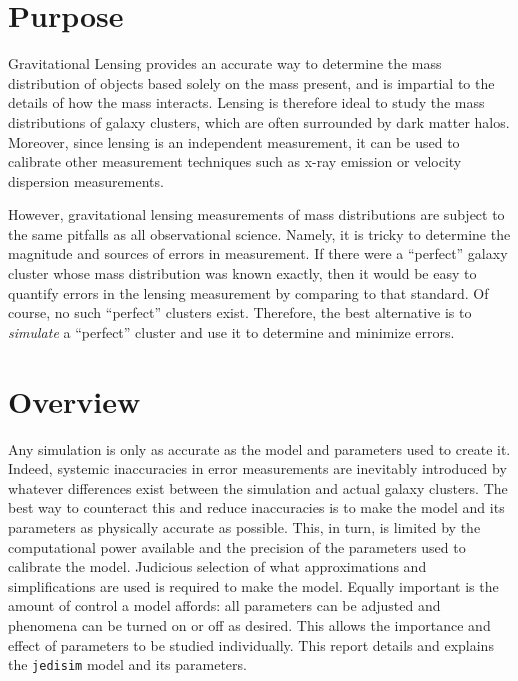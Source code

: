 \documentclass[10pt,twoside]{article}
\theoremstyle{definition}
\theoremstyle{exercise}
\begin{document}
\section{Purpose}

Gravitational Lensing provides an accurate way to determine the mass distribution of objects based solely on the mass present, and is impartial to the details of how the mass interacts. Lensing is therefore ideal to study the mass distributions of galaxy clusters, which are often surrounded by dark matter halos. Moreover, since lensing is an independent measurement, it can be used to calibrate other measurement techniques such as x-ray emission or velocity dispersion measurements.  

  However, gravitational lensing measurements of mass distributions are subject to the same pitfalls as all observational science. Namely, it is tricky to determine the magnitude and sources of errors in measurement. If there were a ``perfect'' galaxy cluster whose mass distribution was known exactly, then it would be easy to quantify errors in the lensing measurement by comparing to that standard. Of course, no such ``perfect'' clusters exist. Therefore, the best alternative is to \textit{simulate} a ``perfect'' cluster and use it to determine and minimize errors.



\section{Overview}

Any simulation is only as accurate as the model and parameters used to create it. Indeed, systemic inaccuracies in error measurements are inevitably introduced by whatever differences exist between the simulation and actual galaxy clusters. The best way to counteract this and reduce inaccuracies is to make the model and its parameters as physically accurate as possible. This, in turn, is limited by the computational power available and the precision of the parameters used to calibrate the model. Judicious selection of what approximations and simplifications are used is required to make the model. Equally important is the amount of control a model affords: all parameters can be adjusted and phenomena can be turned on or off as desired. This allows the importance and effect of parameters to be studied individually. This report details and explains the \texttt{jedisim} model and its parameters.
\end{document}
